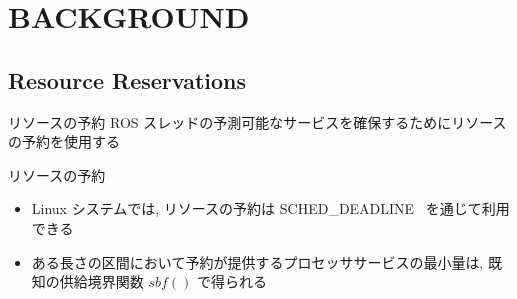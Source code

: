 
\section{BACKGROUND}
\label{sec: background}


\subsection{Resource Reservations}
\label{ssec: resource reservations}

\begin{frame}{リソースの予約}
    ROS スレッドの予測可能なサービスを確保するためにリソースの予約を使用する
    \begin{block}{リソースの予約}
        \begin{itemize}
            \item Linux システムでは, リソースの予約は SCHED\_DEADLINE~\cite{lelli2016deadline} を通じて利用できる
            \item ある長さの区間において予約が提供するプロセッササービスの最小量は, 既知の供給境界関数 $sbf()$ \cite{shin2003periodic, lipari2003resource} で得られる
        \end{itemize}
    \end{block}
\end{frame}



